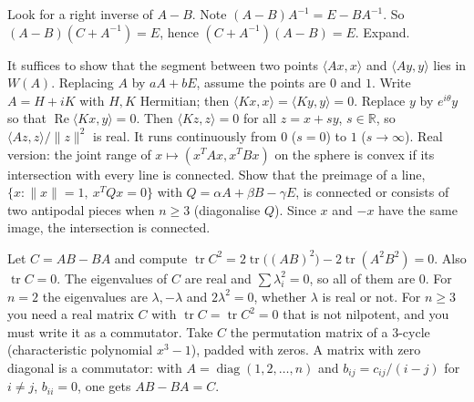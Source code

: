 \documentclass[11pt,a4paper]{article}
\begin{document}
Look for a right inverse of \(A-B\). Note \((A-B)A^{-1}=E-BA^{-1}\).
So \((A-B)(C+A^{-1})=E\), hence \((C+A^{-1})(A-B)=E\). Expand.

It suffices to show that the segment between two points \(\langle Ax,x\rangle\) and \(\langle Ay,y\rangle\) lies in \(W(A)\). Replacing \(A\) by \(aA+bE\), assume the points are \(0\) and \(1\). Write \(A=H+iK\) with \(H,K\) Hermitian; then \(\langle Kx,x\rangle=\langle Ky,y\rangle=0\).
Replace \(y\) by \(e^{i\theta}y\) so that \(\operatorname{Re}\langle Kx,y\rangle=0\). Then \(\langle Kz,z\rangle=0\) for all \(z=x+sy\), \(s\in\mathbb R\), so \(\langle Az,z\rangle/\|z\|^2\) is real. It runs continuously from \(0\) (\(s=0\)) to \(1\) (\(s\to\infty\)).
Real version: the joint range of \(x\mapsto(x^TAx,x^TBx)\) on the sphere is convex if its intersection with every line is connected. Show that the preimage of a line, \(\{x:\|x\|=1,\ x^TQx=0\}\) with \(Q=\alpha A+\beta B-\gamma E\), is connected or consists of two antipodal pieces when \(n\ge3\) (diagonalise \(Q\)). Since \(x\) and \(-x\) have the same image, the intersection is connected.

Let \(C=AB-BA\) and compute \(\operatorname{tr}C^2=2\operatorname{tr}\bigl((AB)^2\bigr)-2\operatorname{tr}(A^2B^2)=0\). Also \(\operatorname{tr}C=0\).
The eigenvalues of \(C\) are real and \(\sum\lambda_i^2=0\), so all of them are \(0\).
For \(n=2\) the eigenvalues are \(\lambda,-\lambda\) and \(2\lambda^2=0\), whether \(\lambda\) is real or not. For \(n\ge3\) you need a real matrix \(C\) with \(\operatorname{tr}C=\operatorname{tr}C^2=0\) that is not nilpotent, and you must write it as a commutator.
Take \(C\) the permutation matrix of a \(3\)-cycle (characteristic polynomial \(x^3-1\)), padded with zeros. A matrix with zero diagonal is a commutator: with \(A=\operatorname{diag}(1,2,\dots,n)\) and \(b_{ij}=c_{ij}/(i-j)\) for \(i\ne j\), \(b_{ii}=0\), one gets \(AB-BA=C\).
\end{document}
